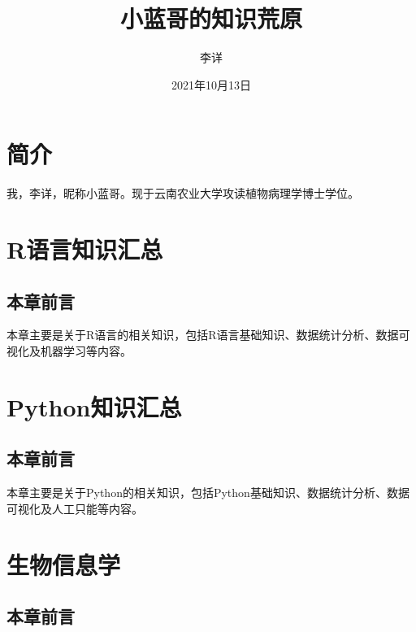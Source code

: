 \documentclass[
]{book}
\title{小蓝哥的知识荒原}
\author{李详}
\date{2021年10月13日}
\begin{document}
\maketitle

{
\setcounter{tocdepth}{1}
\tableofcontents
}
\hypertarget{ux7b80ux4ecb}{%
\chapter*{简介}\label{ux7b80ux4ecb}}

我，李详，昵称小蓝哥。现于云南农业大学攻读植物病理学博士学位。

\hypertarget{r}{%
\chapter{R语言知识汇总}\label{r}}

\hypertarget{ux672cux7ae0ux524dux8a00}{%
\section{本章前言}\label{ux672cux7ae0ux524dux8a00}}

本章主要是关于R语言的相关知识，包括R语言基础知识、数据统计分析、数据可视化及机器学习等内容。

\hypertarget{python}{%
\chapter{Python知识汇总}\label{python}}

\hypertarget{ux672cux7ae0ux524dux8a00-1}{%
\section{本章前言}\label{ux672cux7ae0ux524dux8a00-1}}

本章主要是关于Python的相关知识，包括Python基础知识、数据统计分析、数据可视化及人工只能等内容。

\hypertarget{bioinf}{%
\chapter{生物信息学}\label{bioinf}}

\hypertarget{ux672cux7ae0ux524dux8a00-2}{%
\section{本章前言}\label{ux672cux7ae0ux524dux8a00-2}}
\end{document}
